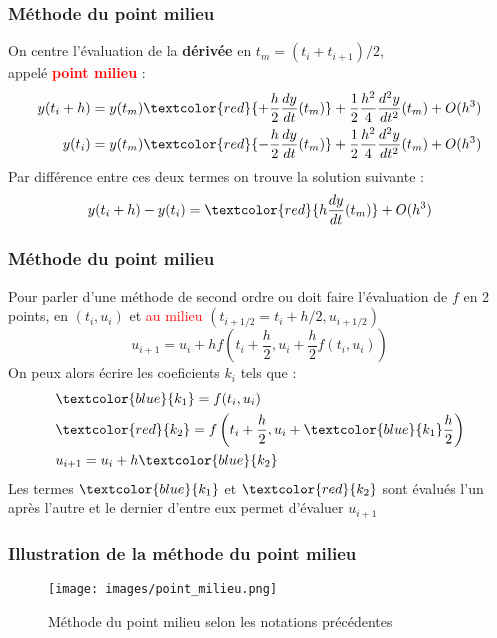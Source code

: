 \documentclass{beamer}
\begin{document}
\begin{frame}
\frametitle{Méthode du point milieu}
On centre l'évaluation de la \textbf{dérivée} en $t_m = (t_i + t_{i+1})/2$, \\
appelé \textcolor{red}{\textbf{point milieu}} :
\begin{align*}
y(t_i + h) = y(t_m) \textcolor{red}{+ \frac{h}{2}\frac{dy}{dt}(t_m)} + \frac{1}{2}\frac{h^2}{4}\frac{d^2y}{dt^2}(t_m) + O(h^3) \\
y(t_i) = y(t_m) \textcolor{red}{- \frac{h}{2}\frac{dy}{dt}(t_m)} + \frac{1}{2}\frac{h^2}{4}\frac{d^2y}{dt^2}(t_m) + O(h^3) \\
\end{align*}
Par différence entre ces deux termes on trouve la solution suivante :\\
\begin{equation*}
	y(t_i+h) - y(t_i) =\textcolor{red}{h\frac{dy}{dt}(t_m)} + O(h^3)
\end{equation*}
\end{frame}



\begin{frame}
\frametitle{Méthode du point milieu}
Pour parler d'une méthode de second ordre ou doit faire l'évaluation de $f$ en 2 points, en $(t_i,u_i)$ et \textcolor{red}{au milieu} $(t_{i+1/2} = t_i + h/2, u_{i+1/2})$
\begin{equation*}
	u_{i+1} = u_i + hf\left( t_i + \frac{h}{2}, u_i + \frac{h}{2}f(t_i,u_i)\right)
\end{equation*}
On peux alors écrire les coeficients $k_i$ tels que :
\begin{align*}
& \textcolor{blue}{k_1} = f(t_i, u_i)\\
& \textcolor{red}{k_2} = f\left( t_i + \frac{h}{2}, u_i + \textcolor{blue}{k_1}\frac{h}{2} \right)\\
& u_{i+1} = u_i + h\textcolor{blue}{k_2}
\end{align*}
Les termes $\textcolor{blue}{k_1}$ et $\textcolor{red}{k_2}$ sont évalués l'un après l'autre et le dernier d'entre eux permet d'évaluer $u_{i+1}$
\end{frame}



\begin{frame}
\frametitle{Illustration de la méthode du point milieu}
\begin{figure}[t]
\texttt{[image: images/point\_milieu.png]}
\caption{\small Méthode du point milieu selon les notations précédentes}
\end{figure}
\end{frame}
\end{document}
